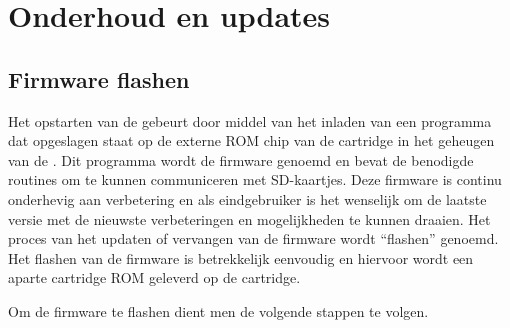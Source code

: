 \chapter{Onderhoud en updates}
\chapterpreamble

%
%
%
\section{Firmware flashen}
\label{sec:firmware-flash}


Het opstarten van de \product gebeurt door middel van het inladen van een programma dat opgeslagen staat op de externe ROM chip van de  cartridge in het geheugen van de . Dit programma wordt de firmware genoemd en bevat de benodigde routines om te kunnen communiceren met SD-kaartjes. Deze firmware is continu onderhevig aan verbetering en als eindgebruiker is het wenselijk om de laatste versie met de nieuwste verbeteringen en mogelijkheden te kunnen draaien. Het proces van het updaten of vervangen van de firmware wordt ``flashen'' genoemd. Het flashen van de firmware is betrekkelijk eenvoudig en hiervoor wordt een aparte cartridge ROM geleverd op de  cartridge.

Om de firmware te flashen dient men de volgende stappen te volgen. 

